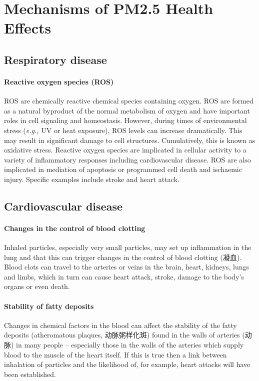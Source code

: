 \documentclass[11pt]{article}
\begin{document}
\section{Mechanisms of PM2.5 Health Effects}

\subsection{Respiratory disease}

\paragraph{Reactive oxygen species (ROS)} ROS are chemically reactive chemical species containing oxygen. ROS are formed as a natural byproduct of the normal metabolism of oxygen and have important roles in cell signaling and homeostasis. However, during times of environmental stress (\textit{e.g.,} UV or heat exposure), ROS levels can increase dramatically. This may result in significant damage to cell structures. Cumulatively, this is known as oxidative stress. Reactive oxygen species are implicated in cellular activity to a variety of inflammatory responses including cardiovascular disease. ROS are also implicated in mediation of apoptosis or programmed cell death and ischaemic injury. Specific examples include stroke and heart attack.

\subsection{Cardiovascular disease}

\paragraph{Changes in the control of blood clotting}  Inhaled particles, especially very small particles, may set up inflammation in the lung and that this can trigger changes in the control of blood clotting (凝血). Blood clots can travel to the arteries or veins in the brain, heart, kidneys, lungs and limbs, which in turn can cause heart attack, stroke, damage to the body's organs or even death.

\paragraph{Stability of fatty deposits}  Changes in chemical factors in the blood can affect the stability of the fatty deposits (atheromatous plaques, 动脉粥样化斑) found in the walls of arteries (动脉) in many people -- especially those in the walls of the arteries which supply blood to the muscle of the heart itself. If this is true then a link between inhalation of particles and the likelihood of, for example, heart attacks will have been established.
\end{document}
